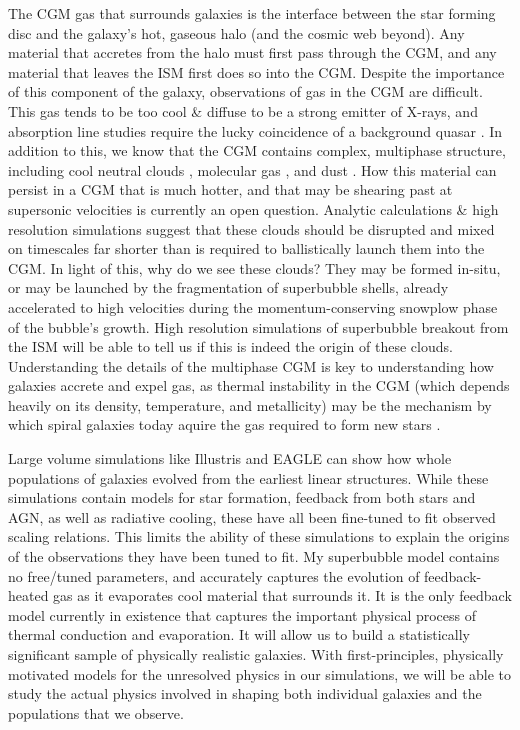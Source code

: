 The CGM gas that surrounds galaxies is the interface between the star forming
disc and the galaxy's hot, gaseous halo (and the cosmic web beyond).  Any
material that accretes from the halo must first pass through the CGM, and any
material that leaves the ISM first does so into the CGM.  Despite the importance
of this component of the galaxy, observations of gas in the CGM are difficult.
This gas tends to be too cool \& diffuse to be a strong emitter of X-rays, and
absorption line studies require the lucky coincidence of a background quasar
\citep{Weiner2009}.  In addition to this, we know that the CGM contains complex,
multiphase structure, including cool neutral clouds \citep{Wakker1997},
molecular gas \citep{Stark1984}, and dust .  How this material can persist in a
CGM that is much hotter, and that may be shearing past at supersonic velocities
is currently an open question.  Analytic calculations \& high resolution
simulations suggest that these clouds should be disrupted and mixed on
timescales far shorter than is required to ballistically launch them into the
CGM.  In light of this, why do we see these clouds?  They may be formed in-situ,
or may be launched by the fragmentation of superbubble shells, already
accelerated to high velocities during the momentum-conserving snowplow phase of
the bubble's growth.  High resolution simulations of superbubble breakout from
the ISM will be able to tell us if this is indeed the origin of these clouds.
Understanding the details of the multiphase CGM is key to
understanding how galaxies accrete and expel gas, as thermal instability in the
CGM (which depends heavily on its density, temperature, and metallicity) may be
the mechanism by which spiral galaxies today aquire the gas required to
form new stars \citep{Marasco2012}.


Large volume simulations like Illustris \citep{Vogelsberger2014b} and EAGLE
\citep{Schaye2015} can show how whole populations of galaxies evolved from the
earliest linear structures.  While these simulations contain models for star
formation, feedback from both stars and AGN, as well as radiative cooling, these
have all been fine-tuned to fit observed scaling relations.  This limits the
ability of these simulations to explain the origins of the observations they
have been tuned to fit.  My superbubble model contains no free/tuned parameters,
and accurately captures the evolution of feedback-heated gas as it evaporates
cool material that surrounds it.  It is the only feedback model currently in
existence that captures the important physical process of thermal conduction and
evaporation.  It will allow us to build a statistically significant sample of
physically realistic galaxies.  With first-principles, physically motivated
models for the unresolved physics in our simulations, we will be able to study
the actual physics involved in shaping both individual galaxies and the
populations that we observe. 


